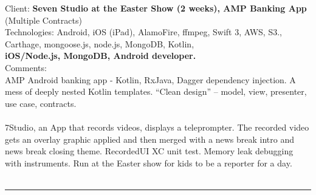 \documentclass{article}
\begin{document}
%


Client: 	\textbf  { Seven Studio at the Easter Show (2 weeks),  AMP Banking App} (Multiple Contracts)  \\
Technologies: 	Android, iOS (iPad), AlamoFire, ffmpeg, Swift 3, AWS, S3., Carthage, mongoose.js, node.js, MongoDB, Kotlin,  \\
\textbf{ 		iOS/Node.js, MongoDB, Android developer. } \\
Comments:	\\ 
AMP Android banking app  - Kotlin, RxJava, Dagger dependency injection.  A mess of deeply nested Kotlin templates. “Clean design” – model, view, presenter, use case, contracts. \\
\\
7Studio, an App that records videos, displays a teleprompter. The recorded video gets an overlay graphic applied and then merged with a news break intro and news break closing theme. RecordedUI XC unit test. Memory leak debugging with instruments. Run at the Easter show for kids to be a reporter for a day. \\
\\

\noindent\hfil\rule{0.5\textwidth}{.4pt}\hfil
\\

%
\end{document}
